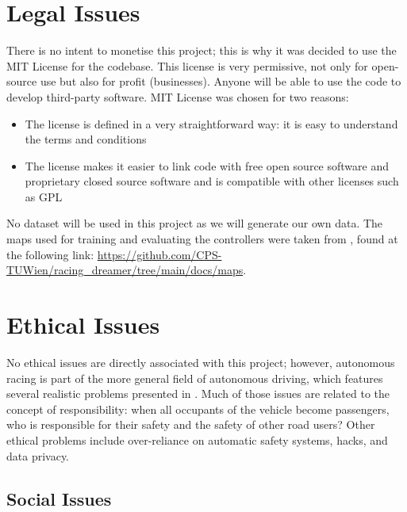 \section{Legal Issues}
\label{legiss}
There is no intent to monetise this project; this is why it was decided to use the MIT License for the codebase. This license is very permissive, not only for open-source use but also for profit (businesses). Anyone will be able to use the code to develop third-party software. MIT License was chosen for two reasons:
\begin{itemize}
	\item The license is defined in a very straightforward way: it is easy to understand the terms and conditions
	\item The license makes it easier to link code with free open source software and proprietary closed source software and is compatible with other licenses such as GPL
\end{itemize}
No dataset will be used in this project as we will generate our own data. The maps used for training and evaluating the controllers were taken from \cite{brunnbauer2022latent}, found at the following link: \url{https://github.com/CPS-TUWien/racing_dreamer/tree/main/docs/maps}.

\section{Ethical Issues}
\label{ethiss}
No ethical issues are directly associated with this project; however, autonomous racing is part of the more general field of autonomous driving, which features several realistic problems presented in \cite{ethical}. Much of those issues are related to the concept of responsibility: when all occupants of the vehicle become passengers, who is responsible for their safety and the safety of other road users? Other ethical problems include over-reliance on automatic safety systems, hacks, and data privacy. 
\subsection{Social Issues}
\label{sociss}

